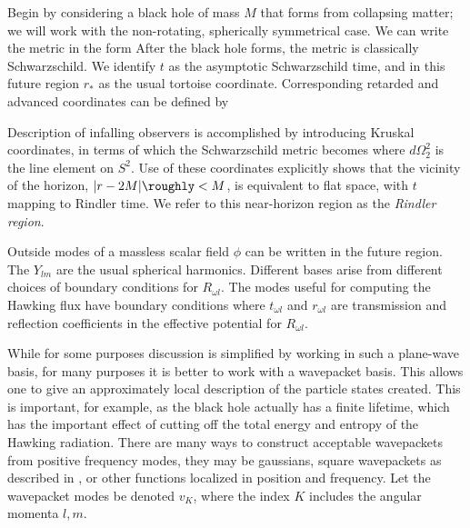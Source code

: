 Begin by considering a black hole of mass $M$ that forms from collapsing matter; we will work with the non-rotating, spherically symmetrical case.  We can write the metric in the form
%
\eqn{}
%
After the black hole forms, the metric is classically Schwarzschild.  We identify $t$ as the asymptotic Schwarzschild time, and in this future region $r_*$ as the usual tortoise coordinate.  Corresponding retarded and advanced coordinates can be defined by
%
\eqn{}
%

Description of infalling observers is accomplished by introducing Kruskal coordinates,
%
\eqn{}
%
in terms of which the Schwarzschild metric becomes
%
\eqn{}
%
where $d\Omega_2^2$ is the line element on $S^2$.  Use of these coordinates explicitly shows that the vicinity of the horizon, $|r-2M|\roughly< M$, is equivalent to flat space, with $t$ mapping to Rindler time.  We refer to this near-horizon region as the {\it Rindler region}. 



Outside modes of a massless scalar field $\phi$ can be written
%
\eqn{}
%
in the future region.  The $Y_{lm}$ are the usual spherical harmonics.  Different bases arise from different choices of boundary conditions for $R_{\omega l}$.  The modes useful for computing the Hawking flux have boundary conditions
%
\eqn{}
%
where $t_{\omega l}$ and $r_{\omega l}$ are transmission and reflection coefficients in the effective potential for $R_{\omega l}$.    

While for some purposes discussion is simplified by working in such a plane-wave basis, for many purposes it is better to work with a wavepacket basis.  This allows one to give an approximately local description of the particle states created.  This is important, for example, as the black hole actually has a finite lifetime, which has the important effect of cutting off the total energy and entropy of the Hawking radiation.
There are many ways to construct acceptable wavepackets from positive frequency modes, they may be gaussians, square wavepackets
%
\eqn{}
%
as described in  , or other functions localized in position and frequency.  
Let the wavepacket modes be denoted $v_K$, where the index $K$ includes the angular momenta $l,m$.  

